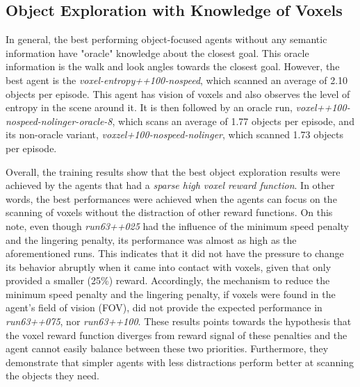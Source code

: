     \subsection{Object Exploration with Knowledge of Voxels} 
        In general, the best performing object-focused agents without any semantic information have "oracle" knowledge about the closest goal. This oracle information is the walk and look angles towards the closest goal. However, the best agent is the \textit{voxel-entropy++100-nospeed}, which scanned an average of 2.10 objects per episode. This agent has vision of voxels and also observes the level of entropy in the scene around it. It is then followed by an oracle run, \textit{voxel++100-nospeed-nolinger-oracle-8}, which scans an average of 1.77 objects per episode, and its non-oracle variant, \textit{voxzel+100-nospeed-nolinger}, which scanned 1.73 objects per episode. 
        
        Overall, the training results show that the best object exploration results were achieved by the agents that had a \textit{sparse high voxel reward function}. In other words, the best performances were achieved when the agents can focus on the scanning of voxels without the distraction of other reward functions. On this note, even though \textit{run63++025} had the influence of the minimum speed penalty and the lingering penalty, its performance was almost as high as the aforementioned runs. This indicates that it did not have the pressure to change its behavior abruptly when it came into contact with voxels, given that only provided a smaller (25\%) reward.
        Accordingly, the mechanism to reduce the minimum speed penalty and the lingering penalty, if voxels were found in the agent's field of vision (FOV), did not provide the expected performance in \textit{run63++075}, nor \textit{run63++100}.
        These results points towards the hypothesis that the voxel reward function diverges from reward signal of these penalties and the agent cannot easily balance between these two priorities.
        Furthermore, they demonstrate that simpler agents with less distractions perform better at scanning the objects they need. 

        
